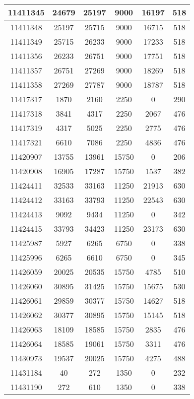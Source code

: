 \begin{appendices}
\begin{center}
\begin{longtable}{|c|c|c|c|c|c|}
11411345 & 24679 & 25197 & 9000  & 16197 & 518 \\ \hline
11411348 & 25197 & 25715 & 9000  & 16715 & 518 \\ \hline
11411349 & 25715 & 26233 & 9000  & 17233 & 518 \\ \hline
11411356 & 26233 & 26751 & 9000  & 17751 & 518 \\ \hline
11411357 & 26751 & 27269 & 9000  & 18269 & 518 \\ \hline
11411358 & 27269 & 27787 & 9000  & 18787 & 518 \\ \hline
11417317 & 1870  & 2160  & 2250  & 0     & 290 \\ \hline
11417318 & 3841  & 4317  & 2250  & 2067  & 476 \\ \hline
11417319 & 4317  & 5025  & 2250  & 2775  & 476 \\ \hline
11417321 & 6610  & 7086  & 2250  & 4836  & 476 \\ \hline
11420907 & 13755 & 13961 & 15750 & 0     & 206 \\ \hline
11420908 & 16905 & 17287 & 15750 & 1537  & 382 \\ \hline
11424411 & 32533 & 33163 & 11250 & 21913 & 630 \\ \hline
11424412 & 33163 & 33793 & 11250 & 22543 & 630 \\ \hline
11424413 & 9092  & 9434  & 11250 & 0     & 342 \\ \hline
11424415 & 33793 & 34423 & 11250 & 23173 & 630 \\ \hline
11425987 & 5927  & 6265  & 6750  & 0     & 338 \\ \hline
11425996 & 6265  & 6610  & 6750  & 0     & 345 \\ \hline
11426059 & 20025 & 20535 & 15750 & 4785  & 510 \\ \hline
11426060 & 30895 & 31425 & 15750 & 15675 & 530 \\ \hline
11426061 & 29859 & 30377 & 15750 & 14627 & 518 \\ \hline
11426062 & 30377 & 30895 & 15750 & 15145 & 518 \\ \hline
11426063 & 18109 & 18585 & 15750 & 2835  & 476 \\ \hline
11426064 & 18585 & 19061 & 15750 & 3311  & 476 \\ \hline
11430973 & 19537 & 20025 & 15750 & 4275  & 488 \\ \hline
11431184 & 40    & 272   & 1350  & 0     & 232 \\ \hline
11431190 & 272   & 610   & 1350  & 0     & 338 \\ \hline

\end{longtable}
\end{center}
\end{appendices}
